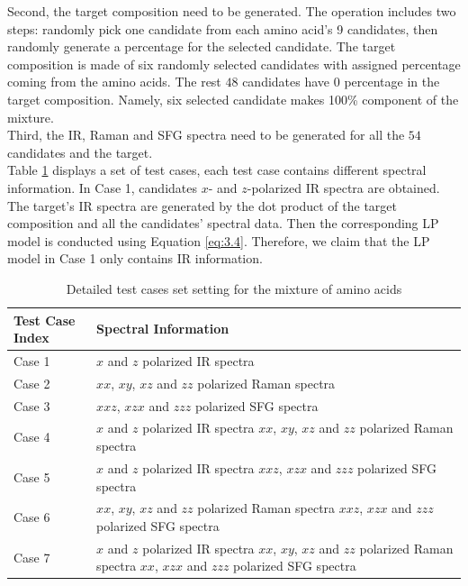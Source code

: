 Second, the target composition need to be generated. The operation includes two steps: randomly pick one candidate from each amino acid's 9 candidates, then randomly generate a percentage for the selected candidate. The target composition is made of six randomly selected candidates with assigned percentage coming from the amino acids. The rest $48$ candidates have $0$ percentage in the target composition. Namely, six selected candidate makes 100\% component of the mixture. \\

Third, the IR, Raman and SFG spectra need to be generated for all the $54$ candidates and the target. \\

Table \ref{tab:5.1} displays a set of test cases, each test case contains different spectral information. In Case 1, candidates $x$- and $z$-polarized IR spectra are obtained. The target's IR spectra are generated by the dot product of the target composition and all the candidates' spectral data. Then the corresponding LP model is conducted using Equation \ref{eq:3.4}. Therefore, we claim that the LP model in Case 1 only contains IR information.\\

\begin{table}
\begin{center}
{\def\arraystretch{1.5}
\begin{tabular}{| l | p{3in} | }
\hline
Test Case Index & Spectral Information \\
\hline
Case 1 & $x$ and $z$ polarized IR spectra\\
\hline
Case 2 & $xx$, $xy$, $xz$ and $zz$ polarized Raman spectra \\
\hline
Case 3 & $xxz$, $xzx$ and $zzz$ polarized SFG spectra \\
\hline
Case 4 & $x$ and $z$ polarized IR spectra \newline $xx$, $xy$, $xz$ and $zz$ polarized Raman spectra \\
\hline
Case 5 & $x$ and $z$ polarized IR spectra \newline $xxz$, $xzx$ and $zzz$ polarized SFG spectra　\\
\hline
Case 6 & $xx$, $xy$, $xz$ and $zz$ polarized Raman spectra \newline $xxz$, $xzx$ and $zzz$ polarized SFG spectra \\
\hline
Case 7 & $x$ and $z$ polarized IR spectra \newline
 $xx$, $xy$, $xz$ and $zz$ polarized Raman spectra \newline 
 $xx$, $xzx$ and $zzz$ polarized SFG spectra \\
\hline
\end{tabular} 
}
\end{center}
\caption{Detailed test cases set setting for the mixture of amino acids} 
\label{tab:5.1} 
\end{table}	

